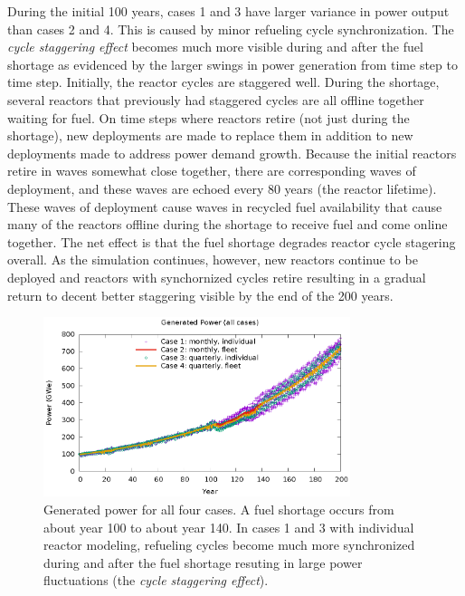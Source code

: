 \documentclass{style}
\begin{document}
During the initial 100 years, cases 1 and 3 have larger variance in power
output than cases 2 and 4.  This is caused by minor refueling cycle
synchronization.  The \emph{cycle staggering effect} becomes much more visible
during and after the fuel shortage as evidenced by the larger swings in power
generation from time step to time step.  Initially, the reactor cycles are
staggered well.  During the shortage, several reactors that previously had
staggered cycles are all offline together waiting for fuel.  On time steps
where reactors retire (not just during the shortage), new deployments are made
to replace them in addition to new deployments made to address power demand
growth.  Because the initial reactors retire in waves somewhat close together,
there are corresponding waves of deployment, and these waves are echoed every
80 years (the reactor lifetime).  These waves of deployment cause waves in
recycled fuel availability that cause many of the reactors offline during the
shortage to receive fuel and come online together.  The net effect is that the
fuel shortage degrades reactor cycle stagering overall.  As the simulation
continues, however, new reactors continue to be deployed and reactors with
synchornized cycles retire resulting in a gradual return to decent better
staggering visible by the end of the 200 years.

\begin{figure}[!h]
    \centering
    \includegraphics[width=0.8\textwidth]{exp2/power.eps}
    \caption[Generated power]{
        Generated power for all four cases.  A fuel shortage occurs from about
        year 100 to about year 140.  In cases 1 and 3 with individual reactor
        modeling, refueling cycles become much more synchronized during and
        after the fuel shortage resuting in large power fluctuations (the
        \emph{cycle staggering effect}).
    }
    \label{fig:power}
\end{figure}
\end{document}
